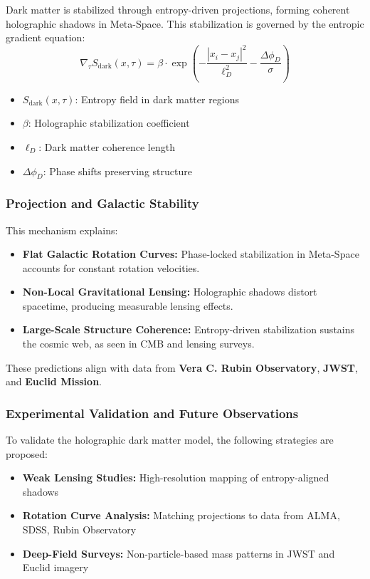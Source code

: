 \documentclass[10.5pt,a4paper]{article}
\begin{document}
Dark matter is stabilized through entropy-driven projections, forming coherent holographic shadows in Meta-Space. This stabilization is governed by the entropic gradient equation:
\[
\nabla_\tau S_{\text{dark}}(x, \tau) = \beta \cdot \exp\left(-\frac{|x_i - x_j|^2}{\ell_D^2} - \frac{\Delta \phi_D}{\sigma}\right)
\]

\begin{itemize}
    \item \(S_{\text{dark}}(x, \tau)\): Entropy field in dark matter regions
    \item \(\beta\): Holographic stabilization coefficient
    \item \(\ell_D\): Dark matter coherence length
    \item \(\Delta \phi_D\): Phase shifts preserving structure
\end{itemize}

\subsubsection{Projection and Galactic Stability}

This mechanism explains:
\begin{itemize}
    \item \textbf{Flat Galactic Rotation Curves:} Phase-locked stabilization in Meta-Space accounts for constant rotation velocities.
    \item \textbf{Non-Local Gravitational Lensing:} Holographic shadows distort spacetime, producing measurable lensing effects.
    \item \textbf{Large-Scale Structure Coherence:} Entropy-driven stabilization sustains the cosmic web, as seen in CMB and lensing surveys.
\end{itemize}

These predictions align with data from \textbf{Vera C. Rubin Observatory}, \textbf{JWST}, and \textbf{Euclid Mission}.

\subsubsection{Experimental Validation and Future Observations}

To validate the holographic dark matter model, the following strategies are proposed:
\begin{itemize}
    \item \textbf{Weak Lensing Studies:} High-resolution mapping of entropy-aligned shadows
    \item \textbf{Rotation Curve Analysis:} Matching projections to data from ALMA, SDSS, Rubin Observatory
    \item \textbf{Deep-Field Surveys:} Non-particle-based mass patterns in JWST and Euclid imagery
\end{itemize}
\end{document}
